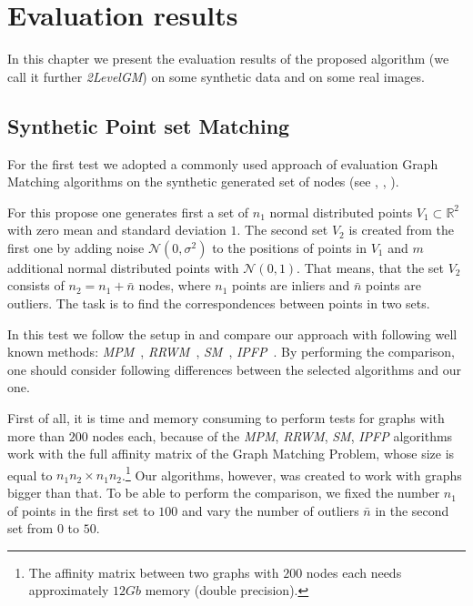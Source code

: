 \chapter{Evaluation results} \label{chapter:results}

In this chapter we present the evaluation results of the proposed algorithm (we call it further \emph{2LevelGM}) on some synthetic data and on some real images.

\section{Synthetic Point set Matching}

For the first test we adopted a commonly used approach of evaluation Graph Matching algorithms on the synthetic generated set of nodes (see \cite{Cho2014_Haystack}, \cite{Cho2010_RRWM}, \cite{Leordeanu2009_IPFP}). 

For this propose one generates first a set of $n_1$ normal distributed points $V_1\subset\mathbb{R}^2$ with zero mean and standard deviation $1$. The second set $V_2$ is created from the first one by adding noise $\mathcal{N}(0,\sigma^2)$ to the positions of points in $V_1$ and $m$ additional normal distributed points with $\mathcal{N}(0,1)$.  That means, that the set $V_2$ consists of $n_2=n_1+\bar{n}$ nodes, where $n_1$ points are inliers and $\bar{n}$ points are outliers. The task is to find the correspondences between points in two sets.

In this test we follow the setup in \cite{Cho2014_Haystack} and compare our approach with following well known 
methods: \emph{MPM}~\cite{Cho2014_Haystack}, \emph{RRWM}~\cite{Cho2010_RRWM}, \emph{SM}~\cite{Leordeanu2005_SM}, \emph{IPFP}~\cite{Leordeanu2009_IPFP}. By performing the comparison, one should consider following differences between the selected algorithms and our one.

First of all, it is time and memory consuming to perform tests for graphs with more than $200$ nodes each, because of the \emph{MPM}, \emph{RRWM}, \emph{SM}, \emph{IPFP} algorithms work with the full affinity matrix of the Graph Matching Problem, whose size is equal to $n_1n_2\times n_1n_2$.\footnote{The affinity matrix between two graphs with $200$ nodes each needs approximately $12Gb$ memory (double precision).} Our algorithms, however, was created to work with graphs bigger than that. To be able to perform the comparison, we fixed the number $n_1$ of points in the first set to $100$ and vary the number of outliers $\bar{n}$ in the second set from $0$ to $50$.

